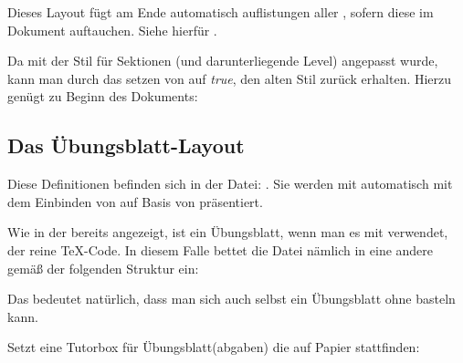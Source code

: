 \begin{bemerkung}
    Dieses Layout fügt am Ende automatisch auflistungen aller , sofern diese im Dokument auftauchen. Siehe hierfür .
\end{bemerkung}

Da mit  der Stil für Sektionen (und darunterliegende Level) angepasst wurde, kann man durch das setzen von  auf \emph{true}, den alten Stil zurück erhalten. Hierzu genügt zu Beginn des Dokuments:
\begin{latex}[morekeywords={[5]{\\lilly@mitschrieb@sectionlines@useold@true}}]
\makeatletter
    \lilly@mitschrieb@sectionlines@useold@true
\makeatother
\end{latex}

%
%
%
%
%

\subsection{Das Übungsblatt-Layout}
Diese Definitionen befinden sich in der Datei: . Sie werden mit  automatisch mit dem Einbinden von  auf Basis von  präsentiert.

\begin{bemerkung}
    Wie in der  bereits angezeigt, ist ein Übungsblatt, wenn man es mit \Jake verwendet, der reine \TeX-Code. In diesem Falle bettet \Jake die Datei nämlich in eine andere gemäß der folgenden Struktur ein:
Das bedeutet natürlich, dass man sich auch selbst ein Übungsblatt ohne \Jake basteln kann.
\end{bemerkung}

%
%
%

Setzt eine Tutorbox für Übungsblatt(abgaben) die auf Papier stattfinden:
\begin{center}
\end{center}


